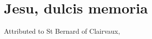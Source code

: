 \documentclass[oldfontcommands,a5paper,openany,oneside]{memoir}
\begin{document}
\autocompilegabc

\thispagestyle{empty}


\clearpage
\pagestyle{empty}

\tableofcontents

\newpage

\section{Jesu, dulcis memoria}


Attributed to St Bernard of Clairvaux, 
\end{document}
